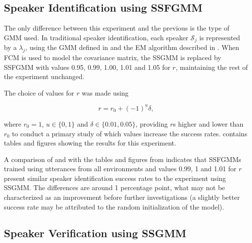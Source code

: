 \subsection{Speaker Identification using SSFGMM}

The only difference between this experiment and the previous is the type of GMM used. In traditional speaker identification, each speaker $\mathcal{S}_j$ is represented by a $\lambda_j$, using the GMM defined in  and the EM algorithm described in . When FCM is used to model the covariance matrix, the SSGMM is replaced by SSFGMM with values 0.95, 0.99, 1.00, 1.01 and 1.05 for $r$, maintaining the rest of the experiment unchanged.

The choice of values for $r$ was made using

\begin{equation}
    r = r_0 + (-1)^u\delta,
    \label{eq:choice-of-r}
\end{equation}

\noindent where $r_0 = 1$, $u \in \{0, 1\}$ and $\delta \in \{0.01, 0.05\}$, providing $r$s higher and lower than $r_0$ to conduct a primary study of which values increase the success rates.  contains tables and figures showing the results for this experiment.

A comparison of  and  with the tables and figures from  indicates that SSFGMMs trained using utterances from all environments and values 0.99, 1 and 1.01 for $r$ present similar speaker identification success rates to the experiment using SSGMM. The differences are around 1 percentage point, what may not be characterized as an improvement before further investigations (a slightly better success rate may be attributed to the random initialization of the model).

\subsection{Speaker Verification using SSGMM}

